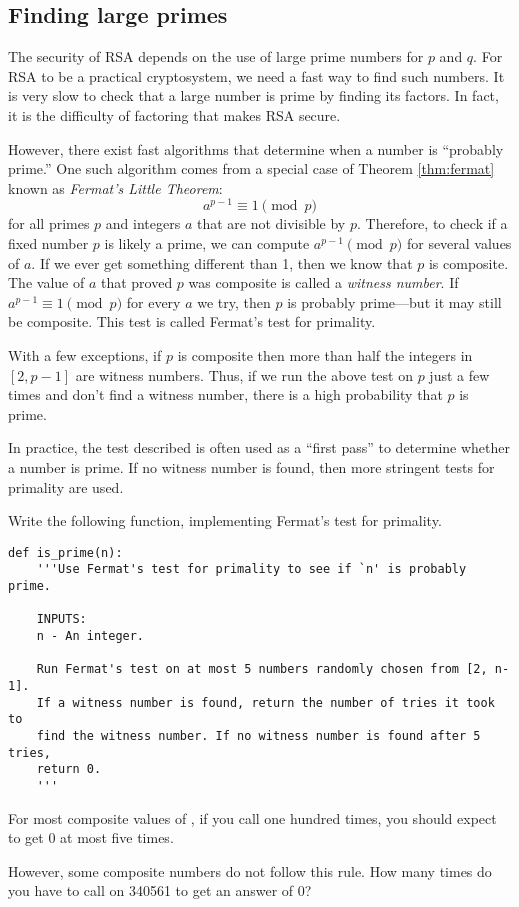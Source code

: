 \subsection*{Finding large primes}
The security of RSA depends on the use of large prime numbers for $p$ and $q$.
For RSA to be a practical cryptosystem, we need a fast way to find such numbers.
It is very slow to check that a large number is prime by finding its factors.
In fact, it is the difficulty of factoring that makes RSA secure.

However, there exist fast algorithms that determine when a number is ``probably prime.''
One such algorithm comes from a special case of Theorem \ref{thm:fermat} known as \emph{Fermat's Little Theorem}:
\[
a^{p-1} \equiv 1 \pmod{p}
\]
for all primes $p$ and integers $a$ that are not divisible by $p$.
Therefore, to check if a fixed number $p$ is likely a prime, we can compute $a^{p-1} \pmod{p}$ for several values of $a$.
If we ever get something different than 1, then we know that $p$ is composite.
The value of $a$ that proved $p$ was composite is called a \emph{witness number}.
If  $a^{p-1} \equiv 1 \pmod{p}$ for every $a$ we try, then $p$ is probably prime---but it may still be composite.
This test is called Fermat's test for primality.

With a few exceptions, if $p$ is composite then more than half the integers in $[2, p-1]$ are witness numbers.
Thus, if we run the above test on $p$ just a few times and don't find a witness number, there is a high probability that $p$ is prime.

In practice, the test described is often used as a ``first pass'' to determine whether a number is prime. 
If no witness number is found, then more stringent tests for primality are used.


\begin{problem}
Write the following function, implementing Fermat's test for primality.
\begin{lstlisting}
def is_prime(n):
    '''Use Fermat's test for primality to see if `n' is probably prime.
    
    INPUTS:
    n - An integer.
    
    Run Fermat's test on at most 5 numbers randomly chosen from [2, n-1]. 
    If a witness number is found, return the number of tries it took to 
    find the witness number. If no witness number is found after 5 tries, 
    return 0.
    '''
\end{lstlisting}
For most composite values of , if you call  one hundred times, you should expect to get 0 at most five times.

However, some composite numbers do not follow this rule. 
How many times do you have to call  on 340561 to get an answer of 0?
\label{prob:prime_confidence}
\end{problem}






